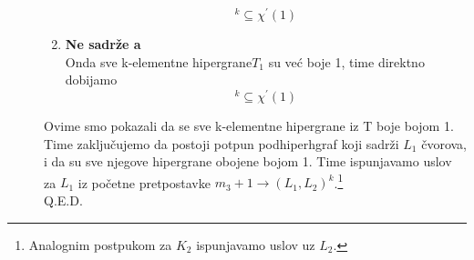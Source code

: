 \documentclass[a4paper]{article}
\begin{document}
\begin{description}
\begin{enumerate}
\begin{equation}
					[ T ]^{k} \subseteq \chi^\prime (1)
				\end{equation}
			\item  \textbf{Ne sadrže a} \\
				Onda sve k-elementne hipergrane$T_1$ su već boje 1, time direktno dobijamo
				\begin{equation}
					[ T ]^k \subseteq \chi^\prime (1)
				\end{equation}
		\end{enumerate}
		Ovime smo pokazali da se sve k-elementne hipergrane iz T boje bojom 1. Time zaključujemo da postoji potpun podhiperhgraf koji sadrži $L_1$ čvorova, i da su sve njegove hipergrane obojene bojom 1. Time ispunjavamo uslov za $L_1$ iz početne pretpostavke $m_3 + 1 \rightarrow (L_1, L_2)^k$.\footnote{Analognim postpukom za $K_2$ ispunjavamo uslov uz $L_2$.}\\
		{\large Q.E.D.}
	\end{description}
\end{document}
